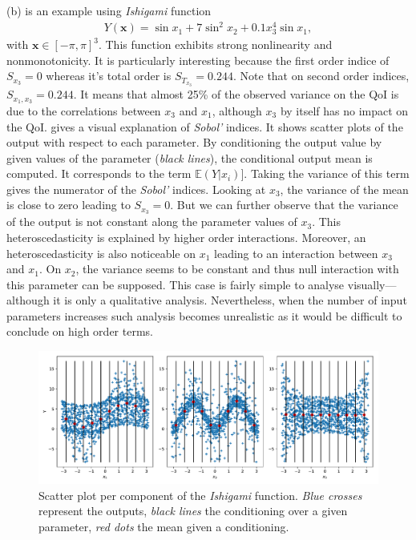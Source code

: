 (b) is an example using \textit{Ishigami} function~\cite{ishigami1990}
\begin{align}
Y(\mathbf{x}) = \sin x_1 + 7 \sin^2 x_2 + 0.1 x_3^4 \sin x_1,
\end{align}
\noindent with $\mathbf{x} \in [-\pi, \pi]^3$. This function exhibits strong nonlinearity and nonmonotonicity. It is particularly interesting because the first order indice of $S_{x_3} = 0$ whereas it's total order is $S_{T_{x_3}} = 0.244$. Note that on second order indices, $S_{x_1,x_3} = 0.244$. It means that almost 25\% of the observed variance on the QoI is due to the correlations between $x_3$ and $x_1$, although $x_3$ by itself has no impact on the QoI.  gives a visual explanation of \emph{Sobol'} indices. It shows scatter plots of the output with respect to each parameter. By conditioning the output value by given values of the parameter (\emph{black lines}), the conditional output mean is computed. It corresponds to the term $\mathbb{E}(Y|x_i)]$. Taking the variance of this term gives the numerator of the \emph{Sobol'} indices. Looking at $x_3$, the variance of the mean is close to zero leading to $S_{x_3} = 0$. But we can further observe that the variance of the output is not constant along the parameter values of $x_3$. This heteroscedasticity is explained by higher order interactions. Moreover, an heteroscedasticity is also noticeable on $x_1$ leading to an interaction between $x_3$ and $x_1$. On $x_2$, the variance seems to be constant and thus null interaction with this parameter can be supposed. This case is fairly simple to analyse visually---although it is only a qualitative analysis. Nevertheless, when the number of input parameters increases such analysis becomes unrealistic as it would be difficult to conclude on high order terms.

\begin{figure}[!h]
\centering
\includegraphics[width=\linewidth,keepaspectratio]{fig/literature/scatter_sobol.pdf}
\caption{Scatter plot per component of the \textit{Ishigami} function. \emph{Blue crosses} represent the outputs, \emph{black lines} the conditioning over a given parameter, \emph{red dots} the mean given a conditioning.}
\label{fig:scatter_sobol}
\end{figure}

